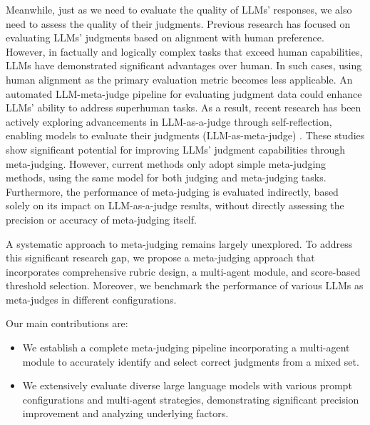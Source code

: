 \documentclass{article}
\theoremstyle{plain}
\theoremstyle{definition}
\theoremstyle{remark}
\begin{document}
Meanwhile, just as we need to evaluate the quality of LLMs' responses, we also need to assess the quality of their judgments. Previous research has focused on evaluating LLMs' judgments based on alignment with human preference\cite{10-zheng2023judging}. However, in factually and logically complex tasks that exceed human capabilities, LLMs have demonstrated significant advantages over human\cite{tan2024judgebench}. In such cases, using human alignment as the primary evaluation metric becomes less applicable. An automated LLM-meta-judge pipeline for evaluating judgment data could enhance LLMs' ability to address superhuman tasks. As a result, recent research has been actively exploring advancements in LLM-as-a-judge through self-reflection, enabling models to evaluate their judgments (LLM-as-meta-judge) \cite{14-wu2024meta} \cite{trivedi2024self}. These studies show significant potential for improving LLMs' judgment capabilities through meta-judging. However, current methods only adopt simple meta-judging methods, using the same model for both judging and meta-judging tasks. Furthermore, the performance of meta-judging is evaluated indirectly, based solely on its impact on LLM-as-a-judge results, without directly assessing the precision or accuracy of meta-judging itself.

A systematic approach to meta-judging remains largely unexplored. To address this significant research gap, we propose a meta-judging approach that incorporates comprehensive rubric design, a multi-agent module, and score-based threshold selection. Moreover, we benchmark the performance of various LLMs as meta-judges in different configurations.


Our main contributions are:
\begin{itemize}
    \item We establish a complete meta-judging pipeline incorporating a multi-agent module to accurately identify and select correct judgments from a mixed set.

\item We extensively evaluate diverse large language models with various prompt configurations and multi-agent strategies, demonstrating significant precision improvement and analyzing underlying factors.

\end{itemize}

\end{document}
